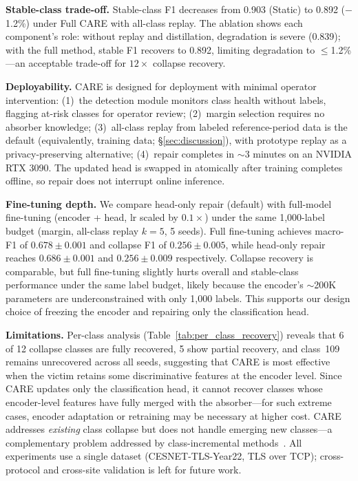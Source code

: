 \documentclass[journal]{IEEEtran}
\newcommand{\ours}{CARE}  %
\begin{document}
\textbf{Stable-class trade-off.}
Stable-class F1 decreases from 0.903 (Static) to 0.892 ($-$1.2\%) under Full \ours{} with all-class replay.
The ablation shows each component's role: without replay and distillation, degradation is severe (0.839); with the full method, stable F1 recovers to 0.892, limiting degradation to ${\leq}$1.2\%---an acceptable trade-off for $12{\times}$ collapse recovery.

\textbf{Deployability.}
\ours{} is designed for deployment with minimal operator intervention:
(1)~the detection module monitors class health without labels, flagging at-risk classes for operator review;
(2)~margin selection requires no absorber knowledge;
(3)~all-class replay from labeled reference-period data is the default (equivalently, training data; \S\ref{sec:discussion}), with prototype replay as a privacy-preserving alternative;
(4)~repair completes in ${\sim}$3 minutes on an NVIDIA RTX 3090.
The updated head is swapped in atomically after training completes offline, so repair does not interrupt online inference.

\textbf{Fine-tuning depth.}
We compare head-only repair (default) with full-model fine-tuning (encoder + head, lr scaled by $0.1{\times}$) under the same 1{,}000-label budget (margin, all-class replay $k{=}5$, 5 seeds).
Full fine-tuning achieves macro-F1 of $0.678{\pm}0.001$ and collapse F1 of $0.256{\pm}0.005$, while head-only repair reaches $0.686{\pm}0.001$ and $0.256{\pm}0.009$ respectively.
Collapse recovery is comparable, but full fine-tuning slightly hurts overall and stable-class performance under the same label budget, likely because the encoder's ${\sim}$200K parameters are underconstrained with only 1{,}000 labels.
This supports our design choice of freezing the encoder and repairing only the classification head.

\textbf{Limitations.}
Per-class analysis (Table~\ref{tab:per_class_recovery}) reveals that 6 of 12 collapse classes are fully recovered, 5 show partial recovery, and class~109 remains unrecovered across all seeds, suggesting that \ours{} is most effective when the victim retains some discriminative features at the encoder level.
Since \ours{} updates only the classification head, it cannot recover classes whose encoder-level features have fully merged with the absorber---for such extreme cases, encoder adaptation or retraining may be necessary at higher cost.
\ours{} addresses \textit{existing} class collapse but does not handle emerging new classes---a complementary problem addressed by class-incremental methods~\cite{cai2024cpn}.
All experiments use a single dataset (CESNET-TLS-Year22, TLS over TCP); cross-protocol and cross-site validation is left for future work.
\end{document}
